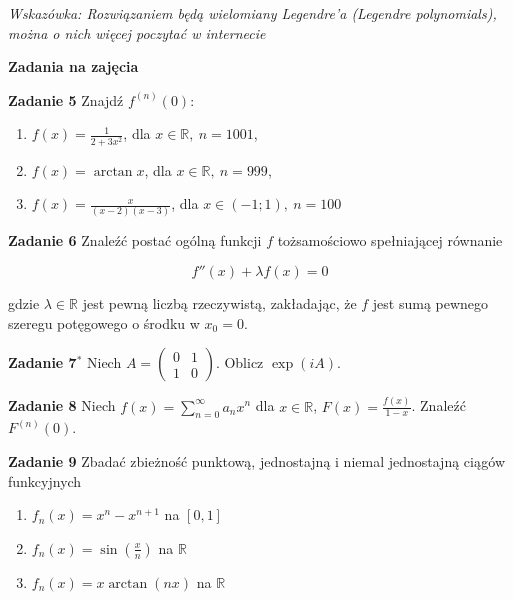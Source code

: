 \documentclass[a4paper,11pt]{article}
\begin{document}
\textit{Wskazówka: Rozwiązaniem będą wielomiany Legendre'a 
(Legendre polynomials), można o nich więcej poczytać w internecie}

\bigskip

\hrulefill

\begin{center}
    \textbf{Zadania na zajęcia}
\end{center}

\bigskip

\textbf{Zadanie 5} Znajdź $f^{(n)}(0)$:

    \begin{enumerate}
        \item $f(x) = \frac{1}{2+3x^2}$, dla $x \in \mathbb{R}, ~n =1001$,
        \item $f(x) = \arctan x$, dla $x \in \mathbb{R}, ~n =999$,
        \item $f(x) = \frac{x}{(x-2)(x-3)}$, dla $x \in (-1;1), ~n=100$
    \end{enumerate}

\bigskip

\textbf{Zadanie 6} Znaleźć postać ogólną funkcji $f$ tożsamościowo
spełniającej równanie

\[
f''(x) + \lambda f(x) = 0
\]

gdzie $\lambda \in \mathbb{R}$ jest pewną liczbą rzeczywistą, zakładając, 
że $f$ jest sumą pewnego szeregu potęgowego o środku w $x_0 = 0$.

\bigskip

\textbf{Zadanie 7$^\ast$} Niech $A = \begin{pmatrix} 0 & 1 \\ 1 & 0 \end{pmatrix}$. Oblicz $\exp(iA)$.

\bigskip

\textbf{Zadanie 8} Niech $f(x) = \sum_{n=0}^\infty a_n x^n$ dla $x \in \mathbb{R}$, $F(x) = \frac{f(x)}{1-x}$. Znaleźć $F^{(n)}(0)$.

\newpage

\textbf{Zadanie 9} Zbadać zbieżność punktową, jednostajną i niemal 
jednostajną ciągów funkcyjnych

\begin{enumerate}
    \item $f_n (x) = x^n - x^{n+1}$ na $[0,1]$
    \item $f_n(x) = \sin\left(\frac{x}{n}\right)$ na $\mathbb{R}$
    \item $f_n(x) = x \arctan(nx)$ na $\mathbb{R}$
\end{enumerate}
\end{document}
